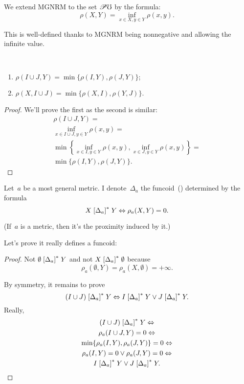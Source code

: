 \begin{defn}
We extend MGNRM to the set $\mathscr{P}\mho$ by the formula:
\[ \rho(X,Y) = \inf_{x\in X,y\in Y}\rho(x,y). \]
\end{defn}

\begin{rem}
This is well-defined thanks to MGNRM being nonnegative and allowing the infinite value.
\end{rem}

\begin{prop}
~
\begin{enumerate}
\item $\rho(I\cup J,Y) = \min\{\rho(I,Y), \rho(J,Y)\}$;
\item $\rho(X,I\cup J) = \min\{\rho(X,I), \rho(Y,J)\}$.
\end{enumerate}
\end{prop}

\begin{proof}
We'll prove the first as the second is similar:
\begin{multline*}
\rho(I\cup J,Y) = \\
\inf_{x\in I\cup J,y\in Y}\rho(x,y) = \\
\min\left\{\inf_{x\in I,y\in Y}\rho(x,y), \inf_{x\in J,y\in Y}\rho(x,y)\right\} = \\
\min\{\rho(I,Y), \rho(J,Y)\}.
\end{multline*}
\end{proof}

Let~$a$ be a most general metric. I denote~$\Delta_a$ the funcoid~(\cite{volume-1}) determined by the formula
\[
X\mathrel{\left[\Delta_a\right]^{\ast}}Y \Leftrightarrow \rho_a(X,Y)=0.
\]

(If~$a$ is a metric, then it's the proximity induced by it.)

Let's prove it really defines a funcoid:

\begin{proof}
Not $\emptyset\mathrel{\left[\Delta_a\right]^{\ast}}Y$ and not $X\mathrel{\left[\Delta_a\right]^{\ast}}\emptyset$ because \[ \rho_{a}(\emptyset,Y)=\rho_{a}(X,\emptyset)=+\infty. \]

By symmetry, it remains to prove
\[ (I\cup J)\mathrel{\left[\Delta_a\right]^{\ast}}Y \Leftrightarrow
I\mathrel{\left[\Delta_a\right]^{\ast}}Y \lor J\mathrel{\left[\Delta_a\right]^{\ast}}Y. \]
Really,
\begin{multline*}
(I\cup J)\mathrel{\left[\Delta_a\right]^{\ast}}Y \Leftrightarrow \\
\rho_a(I\cup J,Y)=0 \Leftrightarrow \\
\min\{\rho_a(I,Y),\rho_a(J,Y)\}=0 \Leftrightarrow \\
\rho_a(I,Y)=0\lor\rho_a(J,Y)=0 \Leftrightarrow \\
I\mathrel{\left[\Delta_a\right]^{\ast}}Y \lor J\mathrel{\left[\Delta_a\right]^{\ast}}Y.
\end{multline*}
\end{proof}

